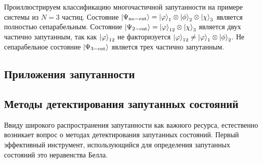 Проиллюстрируем классификацию многочастичной запутанности на примере системы из $N = 3$ частиц.
Состояние 
$\left| \Psi_\mathrm{no-ent} \right\rangle = \left| \varphi \right\rangle_1 \otimes \left| \phi \right\rangle_2 \otimes \left| \chi \right\rangle_3$ 
является полностью сепарабельным. 
Состояние 
$\left| \Psi_{2-\mathrm{ent}} \right\rangle = \left| \varphi \right\rangle_{12} \otimes \left| \chi \right\rangle_3$
является двух частично запутанным, 
так как $\left| \varphi \right\rangle_{12}$ не факторизуется 
$\left| \varphi \right\rangle_{12} \neq \left| \varphi \right\rangle_1 \otimes \left| \phi \right\rangle_2$.
Не сепарабельное состояние $\left| \Psi_{3-\mathrm{ent}} \right\rangle$ является трех частично запутанным.


    

\subsection{Приложения запутанности}


% 
% 
% 


\subsection{Методы детектирования запутанных состояний}
Ввиду широкого распространения запутанности как важного ресурса, 
естественно возникает вопрос о методах детектирования запутанных состояний. 
Первый эффективный инструмент,
использующийся для определения запутанных состояний это неравенства Белла\cite{Bell1964}.

